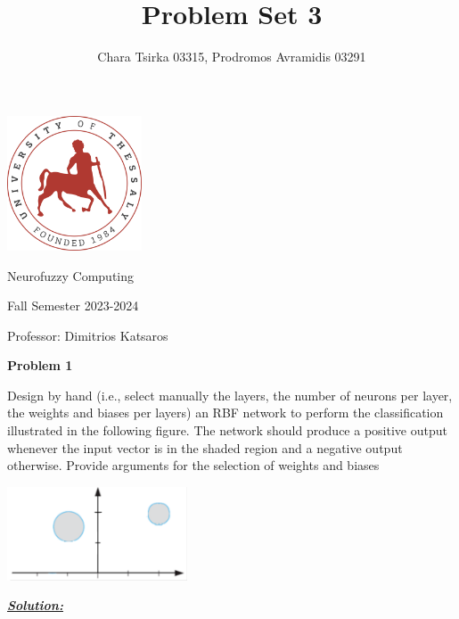 \documentclass{article}
\title{\Huge Problem Set 3}
\author {\Large Chara Tsirka 03315, Prodromos Avramidis 03291}
\begin{document}
\maketitle
\begin{center}
\vspace{1cm}
\includegraphics[width=0.3\textwidth]{uthlogo.png}
\vspace{2cm}
\end{center}
\begin{center}
  \Huge Neurofuzzy Computing \vspace{1cm}

  \Large Fall Semester 2023-2024 \vspace{1cm}

  \Large Professor: Dimitrios Katsaros
\end{center}


\newpage
\noindent \textbf{Problem 1}

\noindent Design by hand (i.e., select manually the layers, the number of neurons per layer, the 
weights and biases per layers) an RBF network to perform the classification illustrated in 
the following figure. The network should produce a positive output whenever the input 
vector is in the shaded region and a negative output otherwise. Provide arguments for the 
selection of weights and biases
\begin{center}    
    \includegraphics[width=0.4\textwidth]{pr1.png}
    \vspace{2cm}
\end{center}



\noindent \underline{\textbf{\textit{Solution:}}}
\end{document}
